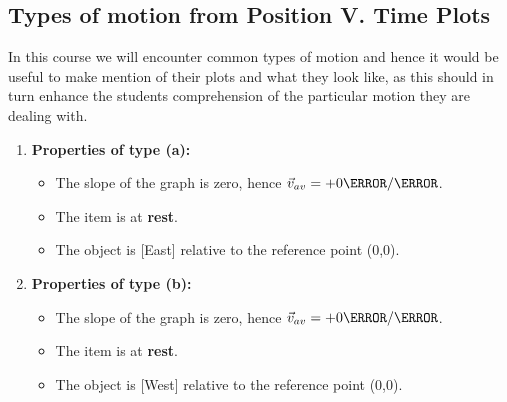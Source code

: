 \documentclass[12pt]{article}
\theoremstyle{break}
\begin{document}
\subsection{Types of motion from Position V. Time Plots}
In this course we will encounter common types of motion and hence it would be useful to make mention of their plots and what they look like, as this should in turn enhance the students comprehension of the particular motion they are dealing with.
\newpage
\begin{enumerate}[label = (\alph*)]
	\item 
		
		\textbf{\large{Properties of type (a):}}
		\begin{itemize}
			\item The slope of the graph is zero, hence $\vec v_{av} = +0\m / \s$.
			\item The item is at \textbf{rest}.
			\item The object is [East] relative to the reference point (0,0).
		\end{itemize}


	\item 
		
		\textbf{\large{Properties of type (b):}}
		\begin{itemize}
			\item The slope of the graph is zero, hence $\vec v_{av} = +0\m / \s$.
			\item The item is at \textbf{rest}.
			\item The object is [West] relative to the reference point (0,0).
		\end{itemize}



\end{enumerate}
\end{document}
